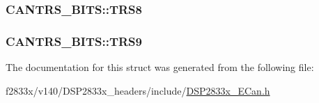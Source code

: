 \subsubsection[{T\+R\+S8}]{ C\+A\+N\+T\+R\+S\+\_\+\+B\+I\+T\+S\+::\+T\+R\+S8}\label{struct_c_a_n_t_r_s___b_i_t_s_af67989cfe42f228b8fe5e1c2eb83413f}
\hypertarget{struct_c_a_n_t_r_s___b_i_t_s_a02621beebec58e2e922585b2e1f312bf}{}
\subsubsection[{T\+R\+S9}]{ C\+A\+N\+T\+R\+S\+\_\+\+B\+I\+T\+S\+::\+T\+R\+S9}\label{struct_c_a_n_t_r_s___b_i_t_s_a02621beebec58e2e922585b2e1f312bf}


The documentation for this struct was generated from the following file\+:\begin{DoxyCompactItemize}
\item 
f2833x/v140/\+D\+S\+P2833x\+\_\+headers/include/\hyperlink{_d_s_p2833x___e_can_8h}{D\+S\+P2833x\+\_\+\+E\+Can.\+h}\end{DoxyCompactItemize}
